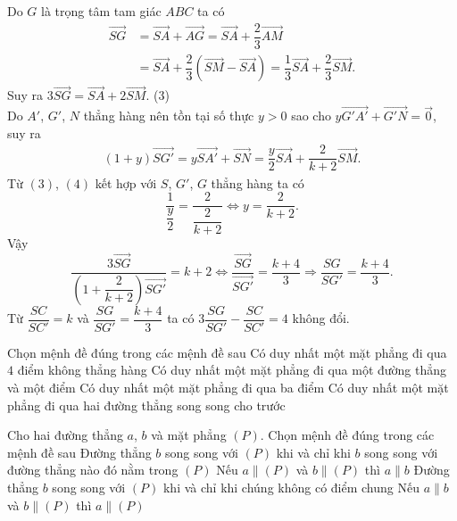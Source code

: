 \begin{ex}
{	Do $G$ là trọng tâm tam giác $ABC$ ta có
	\begin{align*}
	\vec{SG}&= \vec{SA} + \vec{AG} = \vec{SA} + \dfrac{2}{3} \vec{AM}\\
	&=\vec{SA} + \dfrac{2}{3} \left( \vec{SM} - \vec{SA}\right) = \dfrac{1}{3} \vec{SA} + \dfrac{2}{3} \vec{SM}. 
	\end{align*}
	Suy ra $3 \vec{SG} = \vec{SA} + 2 \vec{SM}$. \hfill(3)\\
		Do $A'$, $G'$, $N$ thẳng hàng nên tồn tại số thực $y > 0$ sao cho $y \vec{G'A'}+\vec{G'N} = \vec{0}$, suy ra
	\begin{align*}
	(1+y) \vec{SG'} = y \vec{SA'}+ \vec{SN} = \dfrac{y}{2} \vec{SA} + \dfrac{2}{k+2} \vec{SM}. \tag{4}
	\end{align*}
	Từ $(3)$, $(4) $ kết hợp với $S$, $G'$, $G$ thẳng hàng ta có
	$$\dfrac{1}{\dfrac{y}{2}} = \dfrac{2}{\dfrac{2}{k+2}} \Leftrightarrow y= \dfrac{2}{k+2}.$$
Vậy $$\dfrac{3 \vec{SG}}{(1+\dfrac{2}{k+2}) \vec{SG'}} = k+2 \Leftrightarrow \dfrac{\vec{SG}}{\vec{SG'}} = \dfrac{k+4}{3} \Rightarrow \dfrac{SG}{SG'} =\dfrac{k+4}{3}.$$
Từ $\dfrac{SC}{SC'} =k  $ và $ \dfrac{SG}{SG'} =\dfrac{k+4}{3}$ ta có $3 \dfrac{SG}{SG'}-\dfrac{SC}{SC'} = 4$ không đổi.
}
\end{ex}

\begin{ex}%
	Chọn mệnh đề đúng trong các mệnh đề sau
	\choice
	{Có duy nhất một mặt phẳng đi qua $4$ điểm không thẳng hàng}
	{Có duy nhất một mặt phẳng đi qua một đường thẳng và một điểm}
	{Có duy nhất một mặt phẳng đi qua ba điểm}
	{\True Có duy nhất một mặt phẳng đi qua hai đường thẳng song song cho trước}
\end{ex}


 \begin{ex}%
 	 Cho hai đường thẳng $a$, $b$ và mặt phẳng $(P)$. Chọn mệnh đề đúng trong các mệnh đề sau
 	\choice
 	{Đường thẳng $b$ song song với $(P)$ khi và chỉ khi $b$ song song với đường thẳng nào đó nằm trong $(P)$}
 	{Nếu $a \parallel (P)$ và $b \parallel (P)$ thì $a \parallel b$}
 	{\True Đường thẳng $b$ song song với $(P)$ khi và chỉ khi chúng không có điểm chung}
 	{Nếu $a \parallel b$ và $b \parallel (P)$ thì $a \parallel (P)$}
 \end{ex}


